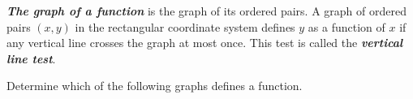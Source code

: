 \documentclass[en,12pt]{elegantbook}
\let\BeginKnitrBlock\begin \let\EndKnitrBlock\end
\begin{document}
\textbf{\emph{The graph of a function}} is the graph of its ordered pairs. A graph of ordered pairs \((x,y)\) in the rectangular coordinate system defines \(y\) as a function of \(x\) if any vertical line crosses the graph at most once. This test is called the \textbf{\emph{vertical line test}}.

\BeginKnitrBlock{example}
\protect\hypertarget{exm:unnamed-chunk-221}{}{\label{exm:unnamed-chunk-221} }
Determine which of the following graphs defines a function.
\EndKnitrBlock{example}

\begin{figure}

{\centering {}

}

\caption{ }\label{fig:fig-ABCD-LaTeX}
\end{figure}
\end{document}
